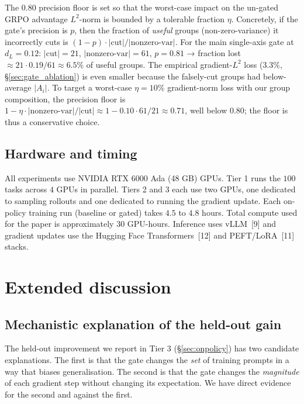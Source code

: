 \documentclass{article}
\begin{document}
The $0.80$ precision floor is set so that the worst-case impact on
the un-gated GRPO advantage $L^2$-norm is bounded by a tolerable
fraction $\eta$. Concretely, if the gate's precision is $p$, then the
fraction of \emph{useful} groups (non-zero-variance) it incorrectly
cuts is $(1\!-\!p) \cdot |\text{cut}| / |\text{nonzero-var}|$. For
the main single-axis gate at $d_L\!=\!0.12$:
$|\text{cut}|\!=\!21$, $|\text{nonzero-var}|\!=\!61$,
$p\!=\!0.81$ → fraction lost $\approx 21 \cdot 0.19 / 61 \approx 6.5\%$
of useful groups. The empirical gradient-$L^2$ loss
($3.3\%$, \S\ref{sec:gate_ablation}) is even smaller because the
falsely-cut groups had below-average $|A_i|$. To target a worst-case
$\eta\!=\!10\%$ gradient-norm loss with our group composition, the
precision floor is $1 - \eta \cdot |\text{nonzero-var}| / |\text{cut}|
\!\approx\! 1 - 0.10 \cdot 61/21 \approx 0.71$, well below $0.80$;
the floor is thus a conservative choice.

\subsection{Hardware and timing}
\label{app:hardware}

All experiments use NVIDIA RTX 6000 Ada (48 GB) GPUs. Tier 1
runs the $100$ tasks across $4$ GPUs in parallel. Tiers 2 and 3
each use two GPUs, one dedicated to sampling rollouts and one
dedicated to running the gradient update. Each on-policy
training run (baseline or gated) takes $4.5$ to $4.8$ hours.
Total compute used for the paper is approximately $30$ GPU-hours.
Inference uses vLLM~[9] and gradient updates use the Hugging Face
Transformers~[12] and PEFT/LoRA~[11] stacks.


\section{Extended discussion}
\label{app:discussion_extended}

\subsection{Mechanistic explanation of the held-out gain}
\label{app:dilution_extended}

The held-out improvement we report in Tier 3
(\S\ref{sec:onpolicy}) has two candidate explanations. The first
is that the gate changes the \emph{set} of training prompts in a
way that biases generalisation. The second is that the gate
changes the \emph{magnitude} of each gradient step without
changing its expectation. We have direct evidence for the second
and against the first.
\end{document}
